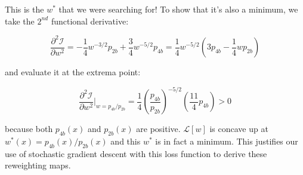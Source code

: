 This is the $w^*$ that we were searching for! To show that it's also a minimum, we take the $2^{nd}$ functional derivative:

\begin{equation*}
\frac{\partial^2 \mathcal{I}}{\partial w^2} = - \frac{1}{4} w ^{-3/2} p_{2b} + \frac{3}{4} w^{-5/2} p_{4b} = \frac{1}{4} w ^{-5/2} \left( 3 p_{4b} - \frac{1}{4} w p_{2b} \right)
\end{equation*}

\noindent
and evaluate it at the extrema point:

\begin{equation*}
 \frac{\partial^2 \mathcal{I}}{\partial w^2} \biggr\rvert_{w = p_{4b} / p_{2b}} =  \frac{1}{4} \left( \frac{p_{4b}}{p_{2b}} \right) ^{-5/2} \left( \frac{11}{4} p_{4b}  \right) > 0
 \end{equation*}

\noindent
because both $p_{4b}(x)$ and $p_{2b}(x)$ are positive. $\mathcal{L}[w]$ is concave up at $w^*(x) = p_{4b} (x) / p_{2b}(x)$ and this $w^*$ is in fact a minimum. 
This justifies our use of stochastic gradient descent with this loss function to derive these reweighting maps.
